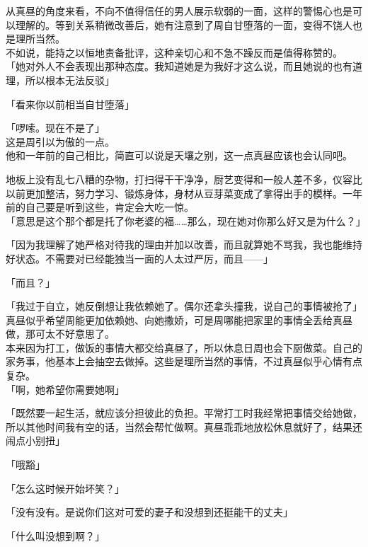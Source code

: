 从真昼的角度来看，不向不值得信任的男人展示软弱的一面，这样的警惕心也是可以理解的。等到关系稍微改善后，她有注意到了周自甘堕落的一面，变得不饶人也是理所当然。\\

不如说，能持之以恒地责备批评，这种亲切心和不急不躁反而是值得称赞的。\\

「她对外人不会表现出那种态度。我知道她是为我好才这么说，而且她说的也有道理，所以根本无法反驳」

「看来你以前相当自甘堕落」

「啰嗦。现在不是了」\\

这是周引以为傲的一点。\\

他和一年前的自己相比，简直可以说是天壤之别，这一点真昼应该也会认同吧。

地板上没有乱七八糟的杂物，打扫得干干净净，厨艺变得和一般人差不多，仪容比以前更加整洁，努力学习、锻炼身体，身材从豆芽菜变成了拿得出手的模样。一年前的自己要是听到这些，肯定会大吃一惊。\\

「意思是这个那个都是托了你老婆的福……那么，现在她对你那么好又是为什么？」

「因为我理解了她严格对待我的理由并加以改善，而且就算她不骂我，我也能维持好状态。不需要对已经能独当一面的人太过严厉，而且——」

「而且？」

「我过于自立，她反倒想让我依赖她了。偶尔还拿头撞我，说自己的事情被抢了」\\

真昼似乎希望周能更加依赖她、向她撒娇，可是周哪能把家里的事情全丢给真昼做，那可太不好意思了。\\

本来因为打工，做饭的事情大都交给真昼了，所以休息日周也会下厨做菜。自己的家务事，他基本上会抽空去做掉。这些是理所当然的事情，不过真昼似乎心情有点复杂。\\

「啊，她希望你需要她啊」

「既然要一起生活，就应该分担彼此的负担。平常打工时我经常把事情交给她做，所以其他时间我有空的话，当然会帮忙做啊。真昼乖乖地放松休息就好了，结果还闹点小别扭」

「哦豁」

「怎么这时候开始坏笑？」

「没有没有。是说你们这对可爱的妻子和没想到还挺能干的丈夫」

「什么叫没想到啊？」

